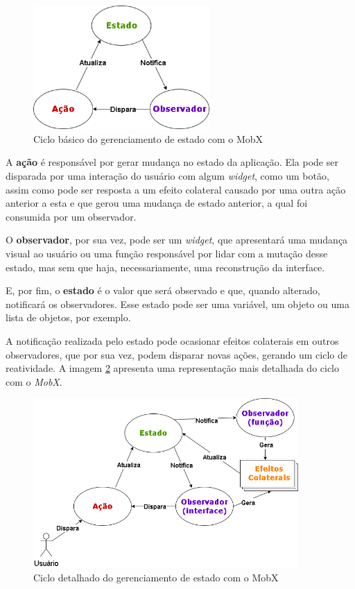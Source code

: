 \begin{figure}[!ht]
  \centering
  \includegraphics[width=0.6\textwidth]{figuras/cap2/2_2_6_mobx-cycle.png}
  \caption{Ciclo básico do gerenciamento de estado com o MobX \protect\cite{mobx-package} \protect\cite{podila18mobx}}
  \label{fig:mobx-cycle}
\end{figure}

A \textbf{ação} é responsável por gerar mudança no estado da aplicação. Ela pode ser disparada por uma interação do usuário com algum \textit{widget}, como um botão, assim como pode ser resposta a um efeito colateral causado por uma outra ação anterior a esta e que gerou uma mudança de estado anterior, a qual foi consumida por um observador.

O \textbf{observador}, por sua vez, pode ser um \textit{widget}, que apresentará uma mudança visual ao usuário ou uma função responsável por lidar com a mutação desse estado, mas sem que haja, necessariamente, uma reconstrução da interface.

E, por fim, o \textbf{estado} é o valor que será observado e que, quando alterado, notificará os observadores. Esse estado pode ser uma variável, um objeto ou uma lista de objetos, por exemplo.

A notificação realizada pelo estado pode ocasionar efeitos colaterais em outros observadores, que por sua vez, podem disparar novas ações, gerando um ciclo de reatividade. A imagem \ref{fig:mobx-details} apresenta uma representação mais detalhada do ciclo com o \textit{MobX}.

\begin{figure}[!ht]
  \centering
  \includegraphics[width=0.9\textwidth]{figuras/cap2/2_2_6_mobx-details.png}
  \caption{Ciclo detalhado do gerenciamento de estado com o MobX \protect\cite{mobx-package} \protect\cite{podila18mobx}}
  \label{fig:mobx-details}
\end{figure}

